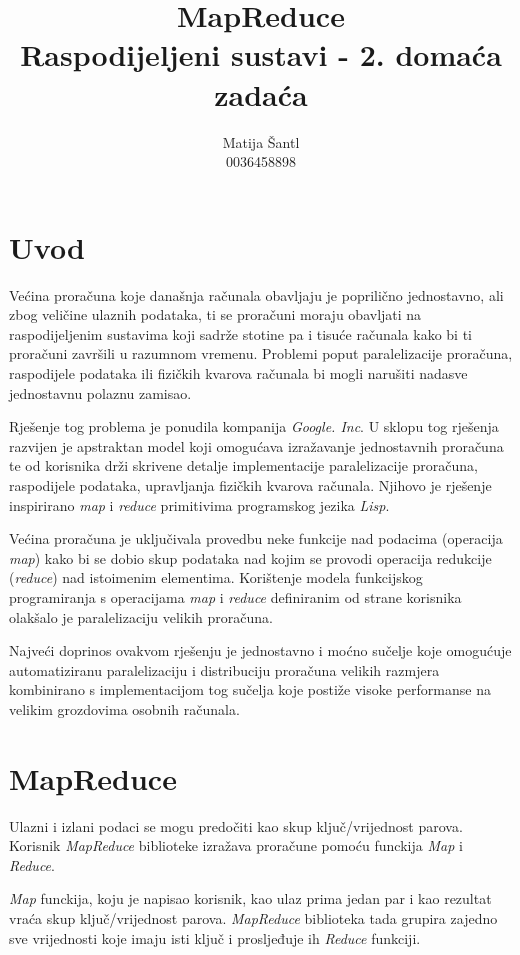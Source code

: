 \documentclass[11pt]{article}
\title{\textbf{MapReduce}\\
		Raspodijeljeni sustavi - 2. domaća zadaća}
\author{Matija Šantl \\
		0036458898}
\date{}
\begin{document}
\maketitle

\section{Uvod}
Većina proračuna koje današnja računala obavljaju je poprilično jednostavno, ali zbog veličine ulaznih podataka, ti se proračuni moraju obavljati na raspodijeljenim sustavima koji sadrže stotine pa i tisuće računala kako bi ti proračuni završili u razumnom vremenu. Problemi poput paralelizacije proračuna, raspodijele podataka ili fizičkih kvarova računala bi mogli narušiti nadasve jednostavnu polaznu zamisao.

Rješenje tog problema je ponudila kompanija \emph{Google. Inc}. U sklopu tog rješenja razvijen je apstraktan model koji omogućava izražavanje jednostavnih proračuna te od korisnika drži skrivene detalje implementacije paralelizacije proračuna, raspodijele podataka, upravljanja fizičkih kvarova računala. Njihovo je rješenje inspirirano \emph{map} i \emph{reduce} primitivima programskog jezika \emph{Lisp}. 

Većina proračuna je uključivala provedbu neke funkcije nad podacima (operacija \emph{map}) kako bi se dobio skup podataka nad kojim se provodi operacija redukcije (\emph{reduce}) nad istoimenim elementima. Korištenje modela funkcijskog programiranja s operacijama \emph{map} i \emph{reduce} definiranim od strane korisnika olakšalo je paralelizaciju velikih proračuna.

Najveći doprinos ovakvom rješenju je jednostavno i moćno sučelje koje omogućuje automatiziranu paralelizaciju i distribuciju proračuna velikih razmjera kombinirano s implementacijom tog sučelja koje postiže visoke performanse na velikim grozdovima osobnih računala.

\section{MapReduce}
Ulazni i izlani podaci se mogu predočiti kao skup ključ/vrijednost parova. Korisnik \emph{MapReduce} biblioteke izražava proračune pomoću funckija \emph{Map} i \emph{Reduce}.

\emph{Map} funckija, koju je napisao korisnik, kao ulaz prima jedan par i kao rezultat vraća skup ključ/vrijednost parova. \emph{MapReduce} biblioteka tada grupira zajedno sve vrijednosti koje imaju isti ključ i prosljeđuje ih \emph{Reduce} funkciji.
\end{document}
